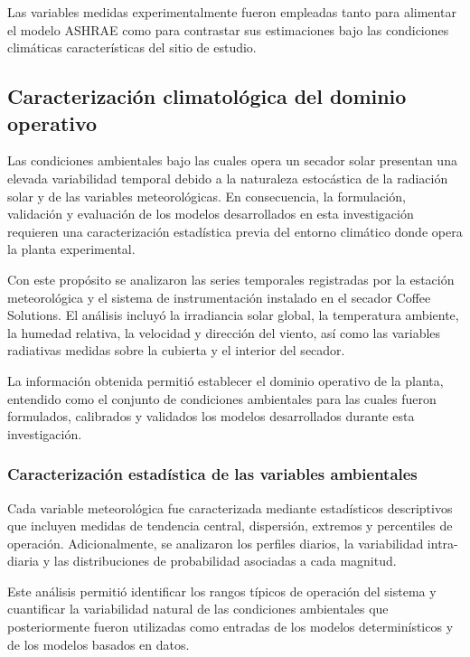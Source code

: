 Las variables medidas experimentalmente fueron empleadas tanto para alimentar el modelo ASHRAE como para contrastar sus estimaciones bajo las condiciones climáticas características del sitio de estudio.


\subsection{Caracterización climatológica del dominio operativo}

Las condiciones ambientales bajo las cuales opera un secador solar presentan una elevada variabilidad temporal debido a la naturaleza estocástica de la radiación solar y de las variables meteorológicas. En consecuencia, la formulación, validación y evaluación de los modelos desarrollados en esta investigación requieren una caracterización estadística previa del entorno climático donde opera la planta experimental.

Con este propósito se analizaron las series temporales registradas por la estación meteorológica y el sistema de instrumentación instalado en el secador Coffee Solutions. El análisis incluyó la irradiancia solar global, la temperatura ambiente, la humedad relativa, la velocidad y dirección del viento, así como las variables radiativas medidas sobre la cubierta y el interior del secador.

La información obtenida permitió establecer el dominio operativo de la planta, entendido como el conjunto de condiciones ambientales para las cuales fueron formulados, calibrados y validados los modelos desarrollados durante esta investigación.

\subsubsection{Caracterización estadística de las variables ambientales}

Cada variable meteorológica fue caracterizada mediante estadísticos descriptivos que incluyen medidas de tendencia central, dispersión, extremos y percentiles de operación. Adicionalmente, se analizaron los perfiles diarios, la variabilidad intra-diaria y las distribuciones de probabilidad asociadas a cada magnitud.

Este análisis permitió identificar los rangos típicos de operación del sistema y cuantificar la variabilidad natural de las condiciones ambientales que posteriormente fueron utilizadas como entradas de los modelos determinísticos y de los modelos basados en datos.

